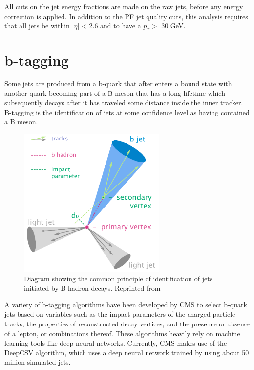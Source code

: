 All cuts on the jet energy fractions are made on the raw jets, before any energy correction is applied. In addition to the PF jet quality cuts, this analysis requires that all jets be within |$\eta$| < 2.6 and to have a $p_{T} > $ 30 GeV. 

\section{b-tagging}
Some jets are produced from a b-quark that after enters a bound state with another quark becoming part of a B meson that has a long lifetime which subsequently decays after it has traveled some distance inside the inner tracker. B-tagging is the identification of jets at some confidence level as having contained a B meson.

\begin{figure}[h]
 	\centering
 	\includegraphics[width=0.65\textwidth]{figures/Btag.png}
 	\singlespace
 	\caption{Diagram showing the common principle of identification of jets initiated by B hadron decays. Reprinted from \cite{wiki:btag}}
  	\label{fig:btagdia} 	
 \end{figure}

A variety of b-tagging algorithms have been developed by CMS to select b-quark jets\cite{BTV-12-001} based on variables such as the impact parameters of the charged-particle tracks, the properties of reconstructed decay vertices, and the presence or absence of a lepton, or combinations thereof. These algorithms heavily rely on machine learning tools like deep neural networks. Currently, CMS makes use of the DeepCSV\cite{Sirunyan_2018, PhysRevD.94.112002} algorithm, which uses a deep neural network trained by using about 50 million simulated jets. 

